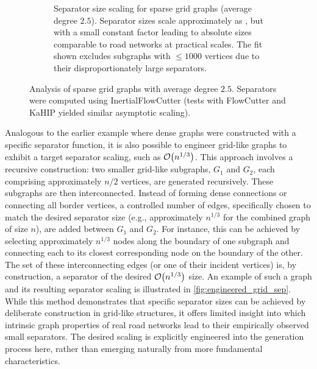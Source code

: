\begin{figure}[tbhp]
\begin{subfigure}[t]{0.55\linewidth}
		\caption{Separator size scaling for sparse grid graphs (average degree \(2.5\)). Separator sizes scale approximately as , but with a small constant factor leading to absolute sizes comparable to road networks at practical scales. The fit shown excludes subgraphs with \( \le 1000 \) vertices due to their disproportionately large separators.}
		\label{fig:sparse_grid_sep_plot}
	\end{subfigure}
	\caption{Analysis of sparse grid graphs with average degree \(2.5\). Separators were computed using InertialFlowCutter (tests with FlowCutter and KaHIP yielded similar asymptotic scaling).}
	\label{fig:sparse_grid_separators}
\end{figure}


Analogous to the earlier example where dense graphs were constructed with a specific separator function, it is also possible to engineer grid-like graphs to exhibit a target separator scaling, such as \(\mathcal{O}\!\left(n^{1/3}\right)\).
This approach involves a recursive construction: two smaller grid-like subgraphs, \(G_1\) and \(G_2\), each comprising approximately \(n/2\) vertices, are generated recursively.
These subgraphs are then interconnected.
Instead of forming dense connections or connecting all border vertices, a controlled number of edges, specifically chosen to match the desired separator size (e.g., approximately \(n^{1/3}\) for the combined graph of size \(n\)), are added between \(G_1\) and \(G_2\).
For instance, this can be achieved by selecting approximately \(n^{1/3}\) nodes along the boundary of one subgraph and connecting each to its closest corresponding node on the boundary of the other.
The set of these interconnecting edges (or one of their incident vertices) is, by construction, a separator of the desired \(\mathcal{O}\!\left(n^{1/3}\right)\) size.
An example of such a graph and its resulting separator scaling is illustrated in \cref{fig:engineered_grid_sep}.
While this method demonstrates that specific separator sizes can be achieved by deliberate construction in grid-like structures, it offers limited insight into which intrinsic graph properties of real road networks lead to their empirically observed small separators.
The desired scaling is explicitly engineered into the generation process here, rather than emerging naturally from more fundamental characteristics.

